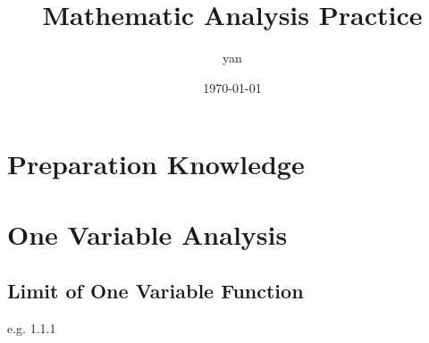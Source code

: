 \documentclass{book}
\title{Mathematic Analysis Practice}
\author{yan}
\date{\today}
\begin{document}
\frontmatter
\maketitle
\tableofcontents
\part{Preparation Knowledge}

\mainmatter

\part{One Variable Analysis}
\chapter{Limit of One Variable Function}
e.g. 1.1.1 
\end{document}
